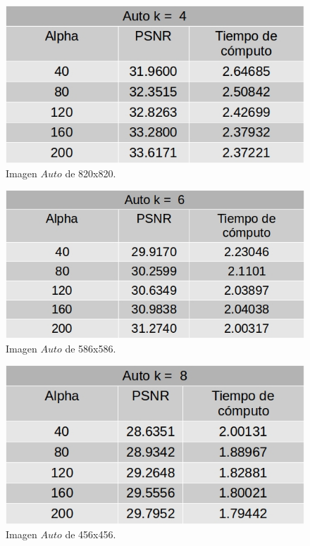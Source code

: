 \documentclass[a4paper]{article}
\begin{document}
    \begin{figure}[H]
    \centering
    \includegraphics[scale=0.4]{imagenes/auto4.jpg}
    \caption{Imagen $Auto$ de 820x820.}
	\label{autoe}
    \end{figure}    
    
    \begin{figure}[H]
    \centering
    \includegraphics[scale=0.4]{imagenes/auto6.jpg}
    \caption{Imagen $Auto$ de 586x586.}
	\label{knnTasa2}
    \end{figure}
    
    
    \begin{figure}[H]
    \centering
    \includegraphics[scale=0.4]{imagenes/auto8.jpg}
    \caption{Imagen $Auto$ de 456x456.}
	\label{knnTasa2}
    \end{figure}
    
\end{document}
